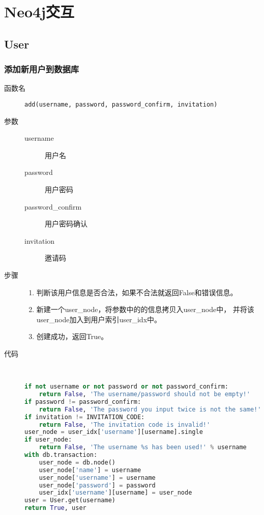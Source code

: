 \documentclass{yaldc}
\begin{document}
\section{Neo4j交互}

\subsection{User}

\subsubsection{添加新用户到数据库}

\begin{description}
    \item[函数名] \verb|add(username, password, password_confirm, invitation)|
    \item[参数]
        \begin{description}
            \item[username] 用户名
            \item[password] 用户密码
            \item[password\_confirm] 用户密码确认
            \item[invitation] 邀请码
        \end{description}
    \item[步骤]
        \begin{enumerate}
            \item 判断该用户信息是否合法，如果不合法就返回False和错误信息。
            \item 新建一个user\_node，将参数中的的信息拷贝入user\_node中，
                并将该user\_node加入到用户索引user\_idx中。
            \item 创建成功，返回True。
        \end{enumerate}
    \item[代码] ~
        \begin{lstlisting}[language=Python]
if not username or not password or not password_confirm:
    return False, 'The username/password should not be empty!'
if password != password_confirm:
    return False, 'The password you input twice is not the same!'
if invitation != INVITATION_CODE:
    return False, 'The invitation code is invalid!'
user_node = user_idx['username'][username].single
if user_node:
    return False, 'The username %s has been used!' % username
with db.transaction:
    user_node = db.node()
    user_node['name'] = username
    user_node['username'] = username
    user_node['password'] = password
    user_idx['username'][username] = user_node
user = User.get(username)
return True, user
        \end{lstlisting}
\end{description}
\end{document}
